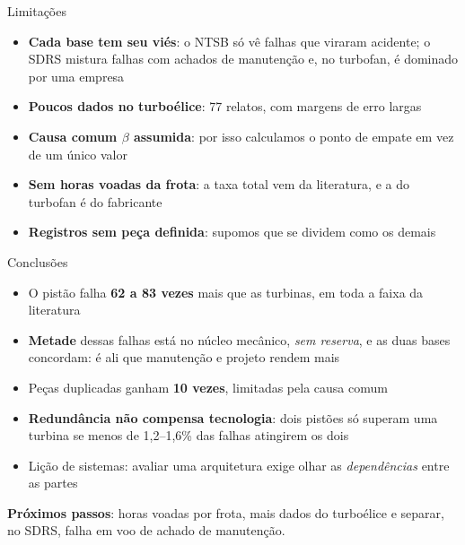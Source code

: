 \documentclass[aspectratio=169,11pt]{beamer}
\newcommand{\destaque}[1]{{\color{ieeeblue}\bfseries #1}}
\begin{document}
\begin{frame}{Limitações}
  \begin{itemize}
    \item \textbf{Cada base tem seu viés}: o NTSB só vê falhas que viraram acidente; o SDRS mistura falhas com achados de manutenção e, no turbofan, é dominado por uma empresa
    \item \textbf{Poucos dados no turboélice}: 77 relatos, com margens de erro largas
    \item \textbf{Causa comum $\beta$ assumida}: por isso calculamos o ponto de empate em vez de um único valor
    \item \textbf{Sem horas voadas da frota}: a taxa total vem da literatura, e a do turbofan é do fabricante
    \item \textbf{Registros sem peça definida}: supomos que se dividem como os demais
  \end{itemize}
\end{frame}

\begin{frame}{Conclusões}
  \begin{itemize}
    \item O pistão falha \destaque{62 a 83 vezes} mais que as turbinas, em toda a faixa da literatura
    \item \destaque{Metade} dessas falhas está no núcleo mecânico, \emph{sem reserva}, e as duas bases concordam: é ali que manutenção e projeto rendem mais
    \item Peças duplicadas ganham \destaque{10 vezes}, limitadas pela causa comum
    \item \destaque{Redundância não compensa tecnologia}: dois pistões só superam uma turbina se menos de 1,2--1,6\% das falhas atingirem os dois
    \item Lição de sistemas: avaliar uma arquitetura exige olhar as \emph{dependências} entre as partes
  \end{itemize}
  \vspace{2mm}
  {\small\textbf{Próximos passos}: horas voadas por frota, mais dados do turboélice e separar, no SDRS, falha em voo de achado de manutenção.\par}
\end{frame}
\end{document}
